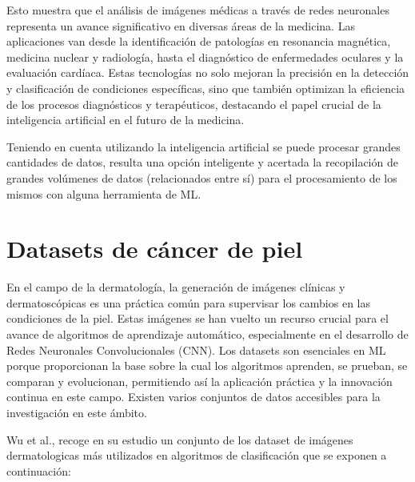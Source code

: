 Esto muestra que el análisis de imágenes médicas a través de redes neuronales representa un avance significativo en diversas áreas de la medicina. Las aplicaciones van desde la identificación de patologías en resonancia magnética, medicina nuclear y radiología, hasta el diagnóstico de enfermedades oculares y la evaluación cardíaca. Estas tecnologías no solo mejoran la precisión en la detección y clasificación de condiciones específicas, sino que también optimizan la eficiencia de los procesos diagnósticos y terapéuticos, destacando el papel crucial de la inteligencia artificial en el futuro de la medicina. 

Teniendo en cuenta utilizando la inteligencia artificial se puede procesar grandes cantidades de datos, resulta una opción inteligente y acertada la recopilación de grandes volúmenes de datos (relacionados entre sí) para el procesamiento de los mismos con alguna herramienta de ML.

\section{Datasets de cáncer de piel}

En el campo de la dermatología, la generación de imágenes clínicas y dermatoscópicas es una práctica común para supervisar los cambios en las condiciones de la piel. Estas imágenes se han vuelto un recurso crucial para el avance de algoritmos de aprendizaje automático, especialmente en el desarrollo de Redes Neuronales Convolucionales (CNN). Los datasets son esenciales en ML porque proporcionan la base sobre la cual los algoritmos aprenden, se prueban, se comparan y evolucionan, permitiendo así la aplicación práctica y la innovación continua en este campo. Existen varios conjuntos de datos accesibles para la investigación en este ámbito.

Wu et al., recoge en su estudio un conjunto de los dataset de imágenes dermatologicas más utilizados en algoritmos de clasificación que se exponen a continuación:


